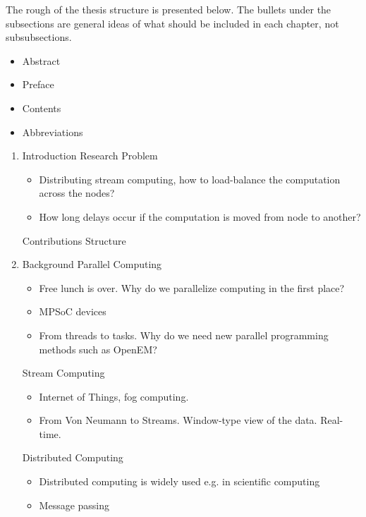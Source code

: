 The rough of the thesis structure is presented below. The bullets under the subsections are general ideas of what should be included in each chapter, not subsubsections.

\begin{itemize}
\item Abstract
\item Preface
\item Contents
\item Abbreviations
\end{itemize}

\begin{enumerate}
\item Introduction
  \subitem Research Problem
  \begin{itemize}[leftmargin=45px]
    \item Distributing stream computing, how to load-balance the computation across the nodes?
    \item How long delays occur if the computation is moved from node to another?
  \end{itemize}
  \subitem Contributions
  \subitem Structure

\item Background
  \subitem Parallel Computing
  \begin{itemize}[leftmargin=45px]
    \item Free lunch is over. Why do we parallelize computing in the first place?
    \item MPSoC devices
    \item From threads to tasks. Why do we need new parallel programming methods such as OpenEM?
  \end{itemize}
  \subitem Stream Computing
  \begin{itemize}[leftmargin=45px]
    \item Internet of Things, fog computing.
    \item From Von Neumann to Streams. Window-type view of the data. Real-time.
  \end{itemize}
  \subitem Distributed Computing
  \begin{itemize}[leftmargin=45px]
    \item Distributed computing is widely used e.g. in scientific computing
    \item Message passing
  \end{itemize}


\end{enumerate}
